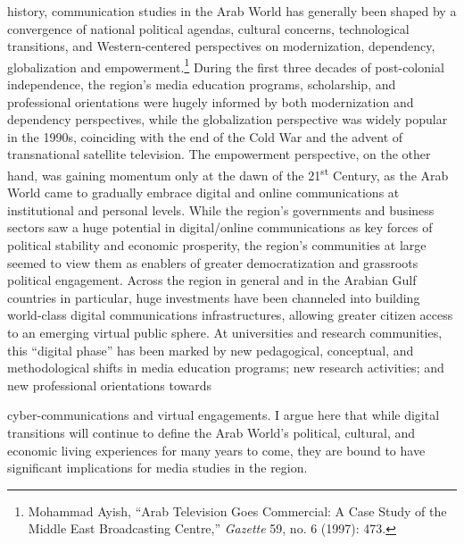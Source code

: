 \documentclass{tufte-handout}
\begin{document}
\begin{titlepage}
\vspace*{1em}


 history, communication studies in the Arab
World has generally been shaped by a convergence of national political
agendas, cultural concerns, technological transitions, and
Western-centered perspectives on modernization, dependency,
globalization and empowerment.\footnote{Mohammad Ayish, ``Arab Television Goes Commercial: A Case Study of the
  Middle East Broadcasting Centre,'' \emph{Gazette} 59, no. 6 (1997):
  473.
}
During the first three decades of post-colonial independence, the
region's media education programs, scholarship, and professional
orientations were hugely informed by both modernization and dependency
perspectives, while the globalization perspective was widely popular in
the 1990s, coinciding with the end of the Cold War and the advent of
transnational satellite television. The empowerment perspective, on the
other hand, was gaining momentum only at the dawn of the
21\textsuperscript{st} Century, as the Arab World came to gradually
embrace digital and online communications at institutional and personal
levels. While the region's governments and business sectors saw a huge
potential in digital/online communications as key forces of political
stability and economic prosperity, the region's communities at large
seemed to view them as enablers of greater democratization and
grassroots political engagement. Across the region in general and in the
Arabian Gulf countries in particular, huge investments have been
channeled into building world-class digital communications
infrastructures, allowing greater citizen access to an emerging virtual
public sphere. At universities and research communities, this ``digital
phase'' has been marked by new pedagogical, conceptual, and
methodological shifts in media education programs; new research
activities; and new professional orientations towards

\enlargethispage{2\baselineskip}

\vspace*{2em}





 \end{titlepage}



\noindent
cyber-communications and virtual engagements. I argue here that while
digital transitions will continue to define the Arab World's political,
cultural, and economic living experiences for many years to come, they
are bound to have significant implications for media studies in the
region.
\end{document}
